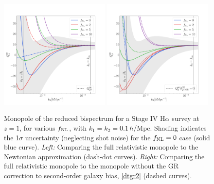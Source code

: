 {{{\begin{figure}[ht]
\centering
\includegraphics[width=0.49\textwidth]{fig/Q_k0_1_noShotnoise1.pdf}
\includegraphics[width=0.49\textwidth]{fig/Q_k0_1_noShotnoise2.pdf}
\caption{ {Monopole of the reduced bispectrum for a Stage IV H$\alpha$ survey at $z=1$,  for various $f_\text{NL}$, with $k_1=k_2=0.1\,h$/Mpc. 
Shading indicates the 1$\sigma$ uncertainty (neglecting shot noise) for the $f_\text{NL}=0$ case (solid blue curve).
{\em Left:} Comparing the full relativistic monopole to the Newtonian approximation (dash-dot curves).   {\em Right:} Comparing the full relativistic monopole to the monopole without the GR correction to second-order  galaxy bias, \eqref{dtgr2} (dashed curves). }}
\label{qmono}
\end{figure}

}}}
